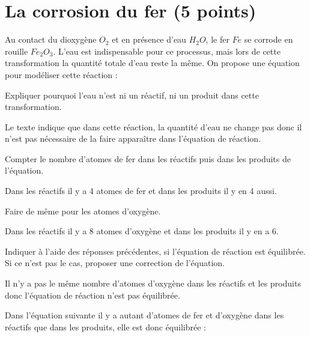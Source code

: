 
\section{La corrosion du fer (5 points)}

Au contact du dioxygène $O_2$ et en présence d'eau $H_2O$, le fer $Fe$ se corrode en rouille $Fe_2O_3$. L'eau est indispensable pour ce processus, mais lors de cette transformation la quantité totale d'eau reste la même. On propose une équation pour modéliser cette réaction : 

\begin{center}
\end{center}


\begin{questions}
	\question[1] Expliquer pourquoi l'eau n'est ni un réactif, ni un produit dans cette transformation.
	\begin{solution}
		Le texte indique que dans cette réaction, la quantité d'eau ne change pas donc il n'est pas nécessaire de la faire apparaître dans l'équation de réaction.
	\end{solution}
	
	\question[1] Compter le nombre d'atomes de fer dans les réactifs puis dans les produits de l'équation.
	\begin{solution}
		Dans les réactifs il y a 4 atomes de fer et dans les produits il y en 4 aussi.
	\end{solution}
	
	\question[1] Faire de même pour les atomes d'oxygène.
	\begin{solution}
		Dans les réactifs il y a 8 atomes d'oxygène et dans les produits il y en a 6.
	\end{solution}
	
	\question[2] Indiquer à l'aide des réponses précédentes, si l'équation de réaction est équilibrée. Si ce n'est pas le cas, proposer une correction de l'équation.
	\begin{solution}
		Il n'y a pas le même nombre d'atomes d'oxygène dans les réactifs et les produits donc l'équation de réaction n'est pas équilibrée. 
		
		Dans l'équation suivante il y a autant d'atomes de fer et d'oxygène dans les réactifs que dans les produits, elle est donc équilibrée :
		\begin{center}
		\end{center}
	\end{solution}
\end{questions}
